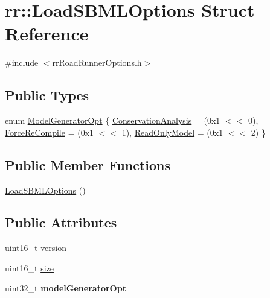 \hypertarget{structrr_1_1_load_s_b_m_l_options}{\section{rr\-:\-:Load\-S\-B\-M\-L\-Options Struct Reference}
\label{structrr_1_1_load_s_b_m_l_options}
}


{\ttfamily \#include $<$rr\-Road\-Runner\-Options.\-h$>$}

\subsection*{Public Types}
\begin{DoxyCompactItemize}
\item 
enum \hyperlink{structrr_1_1_load_s_b_m_l_options_a7b6ca6fc32892dbe782f3eb718762ad6}{Model\-Generator\-Opt} \{ \hyperlink{structrr_1_1_load_s_b_m_l_options_a7b6ca6fc32892dbe782f3eb718762ad6ac12b0c238ca339af0f901dd2c0cd1494}{Conservation\-Analysis} = (0x1 $<$$<$ 0), 
\hyperlink{structrr_1_1_load_s_b_m_l_options_a7b6ca6fc32892dbe782f3eb718762ad6a6cf3ca3062d41e95ad0e66989aff2326}{Force\-Re\-Compile} = (0x1 $<$$<$ 1), 
\hyperlink{structrr_1_1_load_s_b_m_l_options_a7b6ca6fc32892dbe782f3eb718762ad6a41b09f904405a3481688faa484f0f318}{Read\-Only\-Model} = (0x1 $<$$<$ 2)
 \}
\end{DoxyCompactItemize}
\subsection*{Public Member Functions}
\begin{DoxyCompactItemize}
\item 
\hyperlink{structrr_1_1_load_s_b_m_l_options_aa95998812baf41557f365fa6a6118db3}{Load\-S\-B\-M\-L\-Options} ()
\end{DoxyCompactItemize}
\subsection*{Public Attributes}
\begin{DoxyCompactItemize}
\item 
uint16\-\_\-t \hyperlink{structrr_1_1_load_s_b_m_l_options_a131407b1f65a4bba3e7a4af04af5bfe6}{version}
\item 
uint16\-\_\-t \hyperlink{structrr_1_1_load_s_b_m_l_options_aa73e004cfce50848e0ea5a9803800d3c}{size}
\item 
\hypertarget{structrr_1_1_load_s_b_m_l_options_afea20bb329fec8f8ab45be9b0ab78661}{uint32\-\_\-t {\bfseries model\-Generator\-Opt}}\label{structrr_1_1_load_s_b_m_l_options_afea20bb329fec8f8ab45be9b0ab78661}

\end{DoxyCompactItemize}


